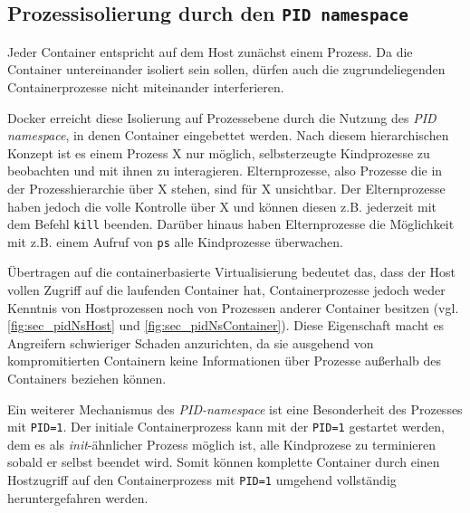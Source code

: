 \documentclass[../main.tex]{subfiles}
\begin{document}

		\subsection{Prozessisolierung durch den \texttt{\acrshort{PID} namespace}}
		\label{secIsoProcesses}

			Jeder Container entspricht auf dem Host zunächst einem Prozess. Da die Container untereinander isoliert sein sollen, dürfen auch die zugrundeliegenden Containerprozesse nicht miteinander interferieren.

			Docker erreicht diese Isolierung auf Prozessebene durch die Nutzung des \emph{\acrshort{PID} namespace}, in denen Container eingebettet werden. Nach diesem hierarchischen Konzept ist es einem Prozess X nur möglich, selbsterzeugte Kindprozesse zu beobachten und mit ihnen zu interagieren. Elternprozesse, also Prozesse die in der Prozesshierarchie über X stehen, sind für X unsichtbar. Der Elternprozesse haben jedoch die volle Kontrolle über X und können diesen z.B. jederzeit mit dem Befehl \texttt{kill} beenden. Darüber hinaus haben Elternprozesse die Möglichkeit mit z.B. einem Aufruf von \texttt{ps} alle Kindprozesse überwachen.

			Übertragen auf die containerbasierte Virtualisierung bedeutet das, dass der Host vollen Zugriff auf die laufenden Container hat, Containerprozesse jedoch weder Kenntnis von Hostprozessen noch von Prozessen anderer Container besitzen (vgl. \fig \ref{fig:sec_pidNsHost} und \fig \ref{fig:sec_pidNsContainer}). Diese Eigenschaft macht es Angreifern schwieriger Schaden anzurichten, da sie ausgehend von kompromitierten Containern keine Informationen über Prozesse außerhalb des Containers beziehen können.

			Ein weiterer Mechanismus des \emph{\acrshort{PID}-namespace} ist eine Besonderheit des Prozesses mit \texttt{PID=1}. Der initiale Containerprozess kann mit der \texttt{PID=1} gestartet werden, dem es als \emph{init}-ähnlicher Prozess möglich ist, alle Kindprozese zu terminieren sobald er selbst beendet wird. Somit können komplette Container durch einen Hostzugriff auf den Containerprozess mit \texttt{PID=1} umgehend vollständig heruntergefahren werden.
\end{document}
